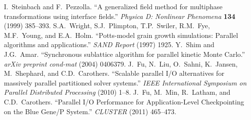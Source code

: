 \documentclass[11pt]{article}
\begin{document}
\begin{multicols*}{2}
\label{LastPage}
\begin{footnotesize}
\begin{thebibliography}{1}
   I.~Steinbach and F.~Pezzolla. ``A generalized field method for multiphase transformations using interface fields.'' \emph{Physica D: Nonlinear Phenomena} \textbf{134} (1999) 385--393.
   S.A.~Wright, S.J.~Plimpton, T.P.~Swiler, R.M.~Fye, M.F.~Young, and E.A.~Holm. ``Potts-model grain growth simulations: Parallel algorithms and applications.'' \emph{SAND Report} (1997) 1925.
   Y.~Shim and J.G.~Amar. ``Synchronous sublattice algorithm for parallel kinetic Monte Carlo.'' \emph{arXiv preprint cond-mat} (2004) 0406379.
   J.~Fu, N.~Liu, O.~Sahni, K.~Jansen, M.~Shephard, and C.D.~Carothers. ``Scalable parallel I/O alternatives for massively parallel partitioned solver systems.'' \emph{IEEE International Symposium on Parallel Distributed Processing} (2010) 1--8.
   J.~Fu, M.~Min, R.~Latham, and C.D.~Carothers. ``Parallel I/O Performance for Application-Level Checkpointing on the Blue Gene/P System.'' \emph{CLUSTER} (2011) 465--473.
\end{thebibliography}
\end{footnotesize}
\end{multicols*}
\end{document}

